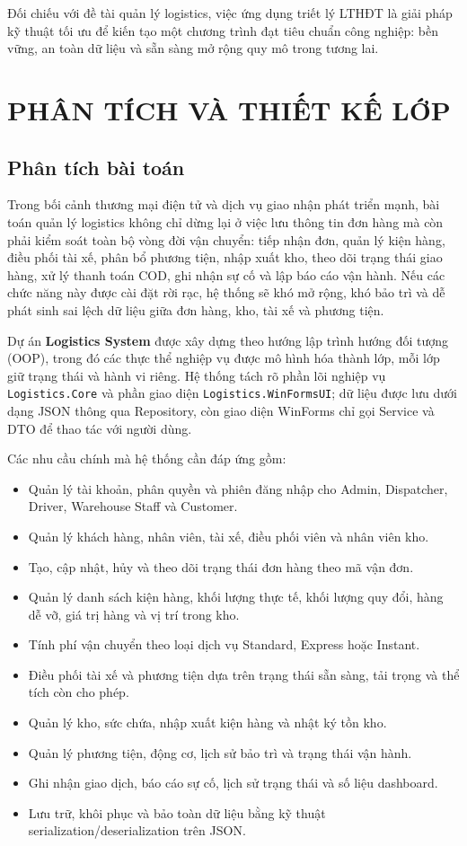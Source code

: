 \documentclass[12pt,a4paper]{article}
\begin{document}
Đối chiếu với đề tài quản lý logistics, việc ứng dụng triết lý LTHĐT là giải pháp kỹ thuật tối ưu để kiến tạo một chương trình đạt tiêu chuẩn công nghiệp: bền vững, an toàn dữ liệu và sẵn sàng mở rộng quy mô trong tương lai.


\newpage
\section{PHÂN TÍCH VÀ THIẾT KẾ LỚP}

\subsection{Phân tích bài toán}

Trong bối cảnh thương mại điện tử và dịch vụ giao nhận phát triển mạnh, bài toán quản lý logistics không chỉ dừng lại ở việc lưu thông tin đơn hàng mà còn phải kiểm soát toàn bộ vòng đời vận chuyển: tiếp nhận đơn, quản lý kiện hàng, điều phối tài xế, phân bổ phương tiện, nhập xuất kho, theo dõi trạng thái giao hàng, xử lý thanh toán COD, ghi nhận sự cố và lập báo cáo vận hành. Nếu các chức năng này được cài đặt rời rạc, hệ thống sẽ khó mở rộng, khó bảo trì và dễ phát sinh sai lệch dữ liệu giữa đơn hàng, kho, tài xế và phương tiện.

Dự án \textbf{Logistics System} được xây dựng theo hướng lập trình hướng đối tượng (OOP), trong đó các thực thể nghiệp vụ được mô hình hóa thành lớp, mỗi lớp giữ trạng thái và hành vi riêng. Hệ thống tách rõ phần lõi nghiệp vụ \texttt{Logistics.Core} và phần giao diện \texttt{Logistics.WinFormsUI}; dữ liệu được lưu dưới dạng JSON thông qua Repository, còn giao diện WinForms chỉ gọi Service và DTO để thao tác với người dùng.

Các nhu cầu chính mà hệ thống cần đáp ứng gồm:

\begin{itemize}[leftmargin=1.2cm]
    \item Quản lý tài khoản, phân quyền và phiên đăng nhập cho Admin, Dispatcher, Driver, Warehouse Staff và Customer.
    \item Quản lý khách hàng, nhân viên, tài xế, điều phối viên và nhân viên kho.
    \item Tạo, cập nhật, hủy và theo dõi trạng thái đơn hàng theo mã vận đơn.
    \item Quản lý danh sách kiện hàng, khối lượng thực tế, khối lượng quy đổi, hàng dễ vỡ, giá trị hàng và vị trí trong kho.
    \item Tính phí vận chuyển theo loại dịch vụ Standard, Express hoặc Instant.
    \item Điều phối tài xế và phương tiện dựa trên trạng thái sẵn sàng, tải trọng và thể tích còn cho phép.
    \item Quản lý kho, sức chứa, nhập xuất kiện hàng và nhật ký tồn kho.
    \item Quản lý phương tiện, động cơ, lịch sử bảo trì và trạng thái vận hành.
    \item Ghi nhận giao dịch, báo cáo sự cố, lịch sử trạng thái và số liệu dashboard.
    \item Lưu trữ, khôi phục và bảo toàn dữ liệu bằng kỹ thuật serialization/deserialization trên JSON.
\end{itemize}
\end{document}
